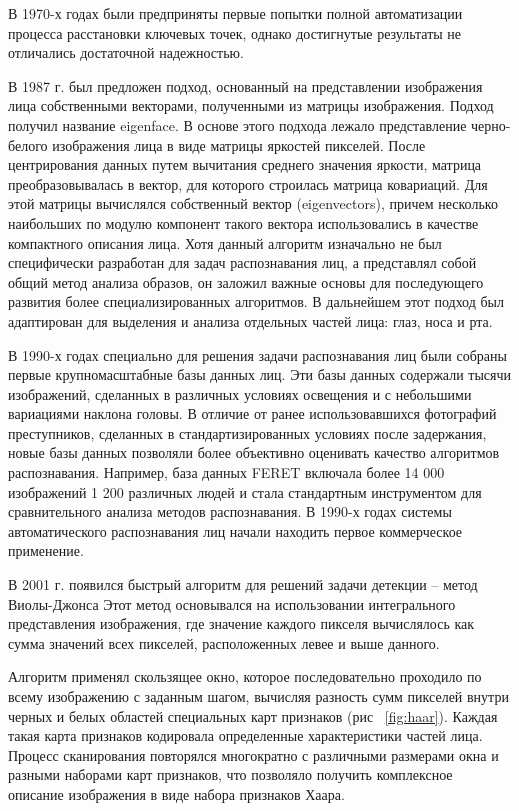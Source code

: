 В 1970-х годах были предприняты первые попытки полной автоматизации процесса расстановки ключевых точек, однако достигнутые результаты не отличались достаточной надежностью.

В 1987 г. был предложен подход, основанный на представлении изображения лица собственными векторами, полученными из матрицы изображения. Подход получил название eigenface. В основе этого подхода лежало представление черно-белого изображения лица в виде матрицы яркостей пикселей. После центрирования данных путем вычитания среднего значения яркости, матрица преобразовывалась в вектор, для которого строилась матрица ковариаций. Для этой матрицы вычислялся собственный вектор (eigenvectors), причем несколько наибольших по модулю компонент такого вектора использовались в качестве компактного описания лица. Хотя данный алгоритм изначально не был специфически разработан для задач распознавания лиц, а представлял собой общий метод анализа образов, он заложил важные основы для последующего развития более специализированных алгоритмов. В дальнейшем этот подход был адаптирован для выделения и анализа отдельных частей лица: глаз, носа и рта.

В 1990-х годах специально для решения задачи распознавания лиц были собраны первые крупномасштабные базы данных лиц. Эти базы данных содержали тысячи изображений, сделанных в различных условиях освещения и с небольшими вариациями наклона головы. В отличие от ранее использовавшихся фотографий преступников, сделанных в стандартизированных условиях после задержания, новые базы данных позволяли более объективно оценивать качество алгоритмов распознавания. Например, база данных FERET включала более 14 000 изображений 1 200 различных людей и стала стандартным инструментом для сравнительного анализа методов распознавания. В 1990-х годах системы автоматического распознавания лиц начали находить первое коммерческое применение.

В 2001 г. появился быстрый алгоритм для решений задачи детекции –  метод Виолы-Джонса  Этот метод основывался на использовании интегрального представления изображения, где значение каждого пикселя вычислялось как сумма значений всех пикселей, расположенных левее и выше данного.

Алгоритм применял скользящее окно, которое последовательно проходило по всему изображению с заданным шагом, вычисляя разность сумм пикселей внутри черных и белых областей специальных карт признаков (рис ~\ref{fig:haar}). Каждая такая карта признаков кодировала определенные характеристики частей лица. Процесс сканирования повторялся многократно с различными размерами окна и разными наборами карт признаков, что позволяло получить комплексное описание изображения в виде набора признаков Хаара.

